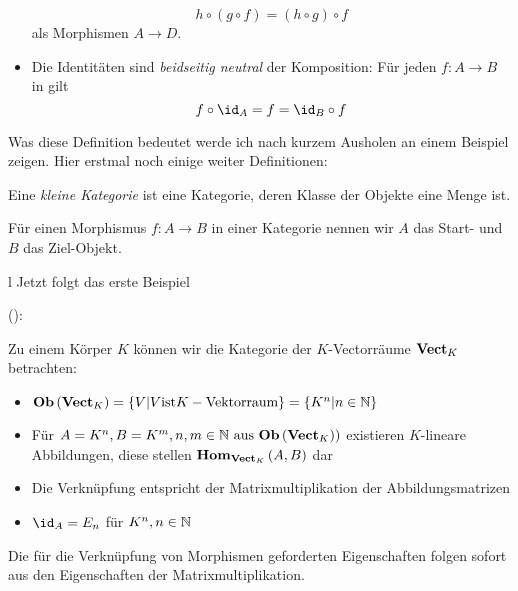 \documentclass{article}
\begin{document}
\begin{defi}[Kategorie]
\begin{itemize}
\begin{displaymath}
				h \circ \left( g \circ f \right) = \left( h \circ g \right) \circ f
			\end{displaymath}
			als Morphismen
			\begin{math}
				A \to D.
			\end{math}
			\item Die Identit\"aten sind \emph{beidseitig neutral} \bzgl der Komposition: F\"ur jeden \Mor 
			\begin{math}
				f: A \to B
			\end{math}
			in \CatC gilt
			\begin{displaymath}
				f \circ \id_A = f = \id_B \circ f
			\end{displaymath}
		\end{itemize}
		\end{defi}
		Was  diese Definition bedeutet werde ich nach kurzem Ausholen an einem Beispiel zeigen.
		Hier erstmal noch einige weiter Definitionen:
		
		\begin{defi} \cite[Definition 2.2.29]{Bra}
		Eine \emph{kleine Kategorie} ist eine Kategorie, deren Klasse der Objekte eine Menge ist.
		\end{defi}
		\begin{defi}  \cite[Bemerkung 2.2.25]{Bra}
		F\"ur einen Morphismus \( f: A \to B \) in einer Kategorie \CatC nennen wir \( A \) das Start- und \( B \) das Ziel-Objekt.
		\end{defi}
		
l		Jetzt folgt das erste Beispiel

		\begin{bsp}
		
	(\cite[Beispiel 2.2.10]{Bra}):
		
		Zu einem K\"orper \( K \) k\"onnen wir die Kategorie der \( K\)-Vectorr\"aume \( \mathbf{Vect}_K \) betrachten:
		\begin{itemize}
			\item	\(  \mathbf{Ob}  \left( \mathbf{Vect}_K \right) = \left\lbrace V | V \text{ist} K-\text{Vektorraum} \right\rbrace  = \left\lbrace K^n | n \in \mathbb{N} \right\rbrace \)
			\item F\"ur  \( A=K^n , B =K^m , n,m \in \BN \ \text{aus} \ \Ob \left( \CatVect_K) \right) \) existieren $K$-lineare Abbildungen, diese stellen \(  \mathbf{Hom } _{\mathbf{Vect}_K}\left( A,B \right) \) dar
			\item Die Verkn\"upfung entspricht der Matrixmultiplikation der Abbildungsmatrizen 
			\item \( \id_A = E_n \) f\"ur \( K^n , n \in \mathbb{N} \)
		 \end{itemize}
		 Die f\"ur die Verkn\"upfung von Morphismen geforderten Eigenschaften folgen sofort aus den Eigenschaften der Matrixmultiplikation.
		 \end{bsp}
		 
\end{document}
